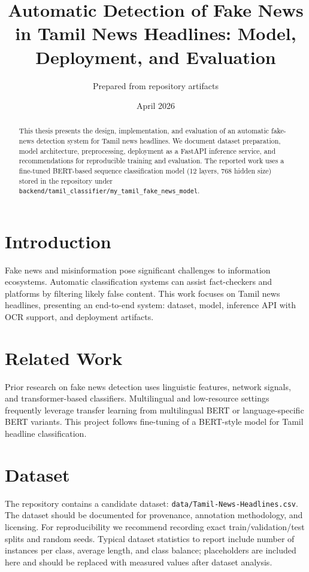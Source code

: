 \documentclass[11pt,a4paper]{article}
\title{Automatic Detection of Fake News in Tamil News Headlines: Model, Deployment, and Evaluation}
\author{Prepared from repository artifacts}
\date{April 2026}
\begin{document}
\maketitle
\begin{abstract}
This thesis presents the design, implementation, and evaluation of an automatic fake-news detection system for Tamil news headlines. We document dataset preparation, model architecture, preprocessing, deployment as a FastAPI inference service, and recommendations for reproducible training and evaluation. The reported work uses a fine-tuned BERT-based sequence classification model (12 layers, 768 hidden size) stored in the repository under \texttt{backend/tamil_classifier/my_tamil_fake_news_model}.
\end{abstract}

\section{Introduction}
Fake news and misinformation pose significant challenges to information ecosystems. Automatic classification systems can assist fact-checkers and platforms by filtering likely false content. This work focuses on Tamil news headlines, presenting an end-to-end system: dataset, model, inference API with OCR support, and deployment artifacts.

\section{Related Work}
Prior research on fake news detection uses linguistic features, network signals, and transformer-based classifiers. Multilingual and low-resource settings frequently leverage transfer learning from multilingual BERT or language-specific BERT variants. This project follows fine-tuning of a BERT-style model for Tamil headline classification.

\section{Dataset}
The repository contains a candidate dataset: \texttt{data/Tamil-News-Headlines.csv}. The dataset should be documented for provenance, annotation methodology, and licensing. For reproducibility we recommend recording exact train/validation/test splits and random seeds. Typical dataset statistics to report include number of instances per class, average length, and class balance; placeholders are included here and should be replaced with measured values after dataset analysis.
\end{document}
